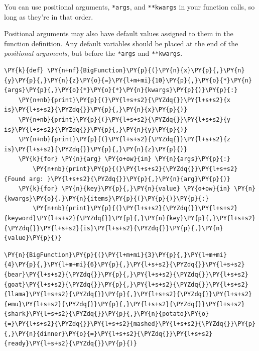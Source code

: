 You can use positional arguments, \texttt{*args}, and \texttt{**kwargs}
in your function calls, so long as they're in that order.

Positional arguments may also have default values assigned to them in
the function definition. Any default variables should be placed at the
end of the \emph{positional arguments}, but before the \texttt{*args}
and \texttt{**kwargs}.

    \begin{tcolorbox}[breakable, size=fbox, boxrule=1pt, pad at break*=1mm,colback=cellbackground, colframe=cellborder]
\begin{Verbatim}[commandchars=\\\{\}]
\PY{k}{def} \PY{n+nf}{BigFunction}\PY{p}{(}\PY{n}{x}\PY{p}{,}\PY{n}{y}\PY{p}{,}\PY{n}{z}\PY{o}{=}\PY{l+m+mi}{10}\PY{p}{,}\PY{o}{*}\PY{n}{args}\PY{p}{,}\PY{o}{*}\PY{o}{*}\PY{n}{kwargs}\PY{p}{)}\PY{p}{:}
    \PY{n+nb}{print}\PY{p}{(}\PY{l+s+s2}{\PYZdq{}}\PY{l+s+s2}{x is}\PY{l+s+s2}{\PYZdq{}}\PY{p}{,}\PY{n}{x}\PY{p}{)}
    \PY{n+nb}{print}\PY{p}{(}\PY{l+s+s2}{\PYZdq{}}\PY{l+s+s2}{y is}\PY{l+s+s2}{\PYZdq{}}\PY{p}{,}\PY{n}{y}\PY{p}{)}
    \PY{n+nb}{print}\PY{p}{(}\PY{l+s+s2}{\PYZdq{}}\PY{l+s+s2}{z is}\PY{l+s+s2}{\PYZdq{}}\PY{p}{,}\PY{n}{z}\PY{p}{)}
    \PY{k}{for} \PY{n}{arg} \PY{o+ow}{in} \PY{n}{args}\PY{p}{:}
        \PY{n+nb}{print}\PY{p}{(}\PY{l+s+s2}{\PYZdq{}}\PY{l+s+s2}{Found arg: }\PY{l+s+s2}{\PYZdq{}}\PY{p}{,}\PY{n}{arg}\PY{p}{)}
    \PY{k}{for} \PY{n}{key}\PY{p}{,}\PY{n}{value} \PY{o+ow}{in} \PY{n}{kwargs}\PY{o}{.}\PY{n}{items}\PY{p}{(}\PY{p}{)}\PY{p}{:}
        \PY{n+nb}{print}\PY{p}{(}\PY{l+s+s2}{\PYZdq{}}\PY{l+s+s2}{keyword}\PY{l+s+s2}{\PYZdq{}}\PY{p}{,}\PY{n}{key}\PY{p}{,}\PY{l+s+s2}{\PYZdq{}}\PY{l+s+s2}{is}\PY{l+s+s2}{\PYZdq{}}\PY{p}{,}\PY{n}{value}\PY{p}{)}
\end{Verbatim}
\end{tcolorbox}

    \begin{tcolorbox}[breakable, size=fbox, boxrule=1pt, pad at break*=1mm,colback=cellbackground, colframe=cellborder]
\begin{Verbatim}[commandchars=\\\{\}]
\PY{n}{BigFunction}\PY{p}{(}\PY{l+m+mi}{3}\PY{p}{,}\PY{l+m+mi}{4}\PY{p}{,}\PY{l+m+mi}{6}\PY{p}{,}\PY{l+s+s2}{\PYZdq{}}\PY{l+s+s2}{bear}\PY{l+s+s2}{\PYZdq{}}\PY{p}{,}\PY{l+s+s2}{\PYZdq{}}\PY{l+s+s2}{goat}\PY{l+s+s2}{\PYZdq{}}\PY{p}{,}\PY{l+s+s2}{\PYZdq{}}\PY{l+s+s2}{llama}\PY{l+s+s2}{\PYZdq{}}\PY{p}{,}\PY{l+s+s2}{\PYZdq{}}\PY{l+s+s2}{emu}\PY{l+s+s2}{\PYZdq{}}\PY{p}{,}\PY{l+s+s2}{\PYZdq{}}\PY{l+s+s2}{shark}\PY{l+s+s2}{\PYZdq{}}\PY{p}{,}\PY{n}{potato}\PY{o}{=}\PY{l+s+s2}{\PYZdq{}}\PY{l+s+s2}{mashed}\PY{l+s+s2}{\PYZdq{}}\PY{p}{,}\PY{n}{dinner}\PY{o}{=}\PY{l+s+s2}{\PYZdq{}}\PY{l+s+s2}{ready}\PY{l+s+s2}{\PYZdq{}}\PY{p}{)}
\end{Verbatim}
\end{tcolorbox}

